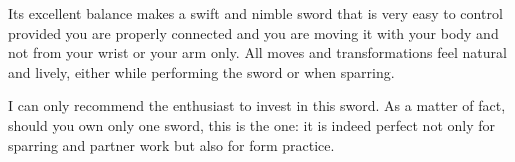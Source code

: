 Its excellent balance makes a swift and nimble sword that is very easy to control provided you are properly connected and you are moving it with your body and not from your wrist or your arm only. All moves and transformations feel natural and lively, either while performing the \Yangjia{} \Michuan{} \Kunlun{} sword or when sparring.

I can only recommend the \Taijijian{} enthusiast to invest in this sword. As a matter of fact, should you own only one sword, this is the one: it is indeed perfect not only for sparring and partner work but also for form practice. 








